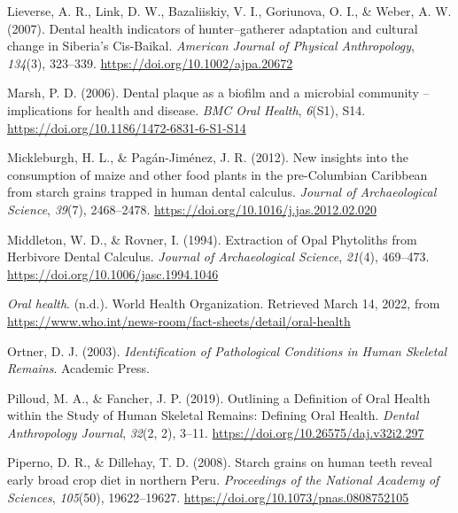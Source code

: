 \documentclass[
  letterpaper,
]{book}
\newlength{\cslhangindent}
\newlength{\cslentryspacingunit} %
\newenvironment{CSLReferences}[2] %
 {%
  \setlength{\parindent}{0pt}
  \ifodd #1
  \let\oldpar\par
  \def\par{\hangindent=\cslhangindent\oldpar}
  \fi
  \setlength{\parskip}{#2\cslentryspacingunit}
 }%
 {}
\begin{document}
\begin{CSLReferences}{1}{0}
\leavevmode{}%
Lieverse, A. R., Link, D. W., Bazaliiskiy, V. I., Goriunova, O. I., \&
Weber, A. W. (2007). Dental health indicators of hunter--gatherer
adaptation and cultural change in {Siberia}'s {Cis-Baikal}.
\emph{American Journal of Physical Anthropology}, \emph{134}(3),
323--339. \url{https://doi.org/10.1002/ajpa.20672}

\leavevmode{}%
Marsh, P. D. (2006). Dental plaque as a biofilm and a microbial
community -- implications for health and disease. \emph{BMC Oral
Health}, \emph{6}(S1), S14.
\url{https://doi.org/10.1186/1472-6831-6-S1-S14}

\leavevmode{}%
Mickleburgh, H. L., \& Pagán-Jiménez, J. R. (2012). New insights into
the consumption of maize and other food plants in the pre-{Columbian
Caribbean} from starch grains trapped in human dental calculus.
\emph{Journal of Archaeological Science}, \emph{39}(7), 2468--2478.
\url{https://doi.org/10.1016/j.jas.2012.02.020}

\leavevmode{}%
Middleton, W. D., \& Rovner, I. (1994). Extraction of {Opal Phytoliths}
from {Herbivore Dental Calculus}. \emph{Journal of Archaeological
Science}, \emph{21}(4), 469--473.
\url{https://doi.org/10.1006/jasc.1994.1046}

\leavevmode{}%
\emph{Oral health}. (n.d.). {World Health Organization}. Retrieved March
14, 2022, from
\url{https://www.who.int/news-room/fact-sheets/detail/oral-health}

\leavevmode{}%
Ortner, D. J. (2003). \emph{Identification of {Pathological Conditions}
in {Human Skeletal Remains}}. {Academic Press}.

\leavevmode{}%
Pilloud, M. A., \& Fancher, J. P. (2019). Outlining a {Definition} of
{Oral Health} within the {Study} of {Human Skeletal Remains}: {Defining
Oral Health}. \emph{Dental Anthropology Journal}, \emph{32}(2, 2),
3--11. \url{https://doi.org/10.26575/daj.v32i2.297}

\leavevmode{}%
Piperno, D. R., \& Dillehay, T. D. (2008). Starch grains on human teeth
reveal early broad crop diet in northern {Peru}. \emph{Proceedings of
the National Academy of Sciences}, \emph{105}(50), 19622--19627.
\url{https://doi.org/10.1073/pnas.0808752105}


\end{CSLReferences}
\end{document}
